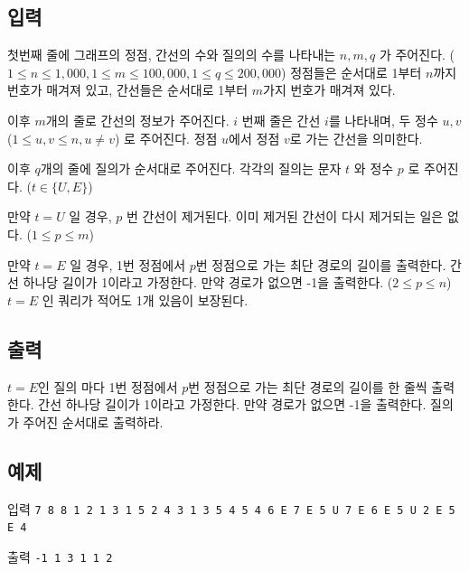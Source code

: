 \documentclass{article}
\begin{document}
\subsection{입력}
첫번째 줄에 그래프의 정점, 간선의 수와 질의의 수를 나타내는 $n, m, q$ 가 주어진다. ($1 \leq n \leq 1,000, 1 \leq m \leq 100,000, 1 \leq q \leq 200,000$) 정점들은 순서대로 1부터 $n$까지 번호가 매겨져 있고, 간선들은 순서대로 1부터 $m$가지 번호가 매겨져 있다. \newline

이후 $m$개의 줄로 간선의 정보가 주어진다. $i$ 번째 줄은 간선 $i$를 나타내며, 두 정수 $u, v$ ($1 \leq u, v \leq n, u \neq v$) 로 주어진다. 정점 $u$에서 정점 $v$로 가는 간선을 의미한다. \newline

이후 $q$개의 줄에 질의가 순서대로 주어진다. 각각의 질의는 문자 $t$ 와 정수 $p$ 로 주어진다. ($t \in \{U, E\}$) \newline

만약 $t = U$ 일 경우, $p$ 번 간선이 제거된다. 이미 제거된 간선이 다시 제거되는 일은 없다. ($1 \leq p \leq m$) \newline

만약 $t = E$ 일 경우, 1번 정점에서 $p$번  정점으로 가는 최단 경로의 길이를 출력한다. 간선 하나당 길이가 1이라고 가정한다. 만약 경로가 없으면 -1을 출력한다. ($2 \leq p \leq n$) $t = E$ 인 쿼리가 적어도 1개 있음이 보장된다.

\subsection{출력}
$t = E$인 질의 마다 1번 정점에서 $p$번  정점으로 가는 최단 경로의 길이를 한 줄씩 출력한다. 간선 하나당 길이가 1이라고 가정한다. 만약 경로가 없으면 -1을 출력한다. 질의가 주어진 순서대로 출력하라.

\subsection{예제}
입력
\bgroup\obeylines
\texttt{7 8 8
	1 2
	1 3
	1 5
	2 4
	3 1
	3 5
	4 5
	4 6
	E 7
	E 5
	U 7
	E 6
	E 5
	U 2
	E 5
	E 4	\newline}
\egroup

출력
\bgroup\obeylines
\texttt{-1
	1
	3
	1
	1
	2	\newline}
\egroup

\newpage

\newpage
\end{document}
